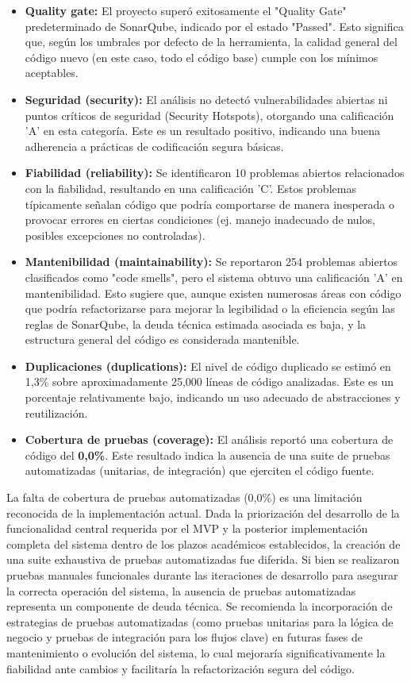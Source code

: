 \begin{itemize}
    \item \textbf{Quality gate:} El proyecto superó exitosamente el "Quality Gate" predeterminado de SonarQube, indicado por el estado "Passed". Esto significa que, según los umbrales por defecto de la herramienta, la calidad general del código nuevo (en este caso, todo el código base) cumple con los mínimos aceptables.
    \item \textbf{Seguridad (security):} El análisis no detectó vulnerabilidades abiertas ni puntos críticos de seguridad (Security Hotspots), otorgando una calificación 'A' en esta categoría. Este es un resultado positivo, indicando una buena adherencia a prácticas de codificación segura básicas.
    \item \textbf{Fiabilidad (reliability):} Se identificaron 10 problemas abiertos relacionados con la fiabilidad, resultando en una calificación 'C'. Estos problemas típicamente señalan código que podría comportarse de manera inesperada o provocar errores en ciertas condiciones (ej. manejo inadecuado de nulos, posibles excepciones no controladas).
    \item \textbf{Mantenibilidad (maintainability):} Se reportaron 254 problemas abiertos clasificados como "code smells", pero el sistema obtuvo una calificación 'A' en mantenibilidad. Esto sugiere que, aunque existen numerosas áreas con código que podría refactorizarse para mejorar la legibilidad o la eficiencia según las reglas de SonarQube, la deuda técnica estimada asociada es baja, y la estructura general del código es considerada mantenible.
    \item \textbf{Duplicaciones (duplications):} El nivel de código duplicado se estimó en 1,3\% sobre aproximadamente 25,000 líneas de código analizadas. Este es un porcentaje relativamente bajo, indicando un uso adecuado de abstracciones y reutilización.
    \item \textbf{Cobertura de pruebas (coverage):} El análisis reportó una cobertura de código del \textbf{0,0\%}. Este resultado indica la ausencia de una suite de pruebas automatizadas (unitarias, de integración) que ejerciten el código fuente.
\end{itemize}

La falta de cobertura de pruebas automatizadas (0,0\%) es una limitación reconocida de la implementación actual. Dada la priorización del desarrollo de la funcionalidad central requerida por el MVP y la posterior implementación completa del sistema dentro de los plazos académicos establecidos, la creación de una suite exhaustiva de pruebas automatizadas fue diferida. Si bien se realizaron pruebas manuales funcionales durante las iteraciones de desarrollo para asegurar la correcta operación del sistema, la ausencia de pruebas automatizadas representa un componente de deuda técnica. Se recomienda la incorporación de estrategias de pruebas automatizadas (como pruebas unitarias para la lógica de negocio y pruebas de integración para los flujos clave) en futuras fases de mantenimiento o evolución del sistema, lo cual mejoraría significativamente la fiabilidad ante cambios y facilitaría la refactorización segura del código.

